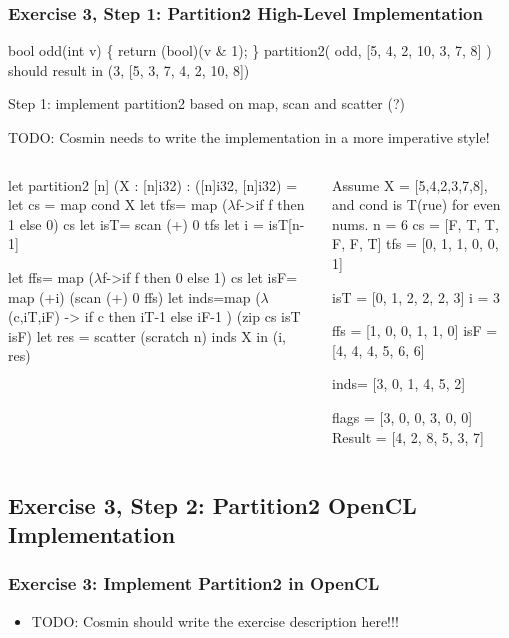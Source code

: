 \documentclass{beamer}
\newcommand{\mymath}[1]{$ #1 $}
\begin{document}
\begin{frame}[fragile,t]
  \frametitle{Exercise 3, Step 1: Partition2 High-Level Implementation}

\begin{colorcode}
bool odd(int v) \{ return (bool)(v & 1); \}
partition2( odd, [5, 4, 2, 10, 3, 7, 8] ) should result in
             (3, [5, 3, 7, 4, 2, 10, 8])
\end{colorcode}

Step 1: implement partition2 based on map, scan and scatter (?)\pause

TODO: Cosmin needs to write the implementation in a more imperative style!

\begin{columns}
\begin{colorcode}
let partition2 [n] (X : [n]i32) : 
              ([n]i32, [n]i32) =
 let cs = map cond X
 let tfs= map (\mymath{\lambda}f->if f then 1 
                        else 0) cs
 let isT= scan (+) 0 tfs
 let i  = isT[n-1]

 let ffs= map (\mymath{\lambda}f->if f then 0 
                        else 1) cs
 let isF= map (+i) (scan (+) 0 ffs)
 let inds=map (\mymath{\lambda}(c,iT,iF) -> 
                  if c then iT-1 
                       else iF-1
              ) (zip cs isT isF)
 let res = scatter (scratch n) inds X
 in (i, res)
\end{colorcode}
\vspace{-2ex}
\begin{colorcode}[fontsize=\scriptsize]
Assume X = [5,4,2,3,7,8], and 
cond is T(rue) for even nums.\pause
n   = 6
cs  = [F, T, T, F, F, T]
tfs = [0, 1, 1, 0, 0, 1]

isT = [0, 1, 2, 2, 2, 3]
i   = 3

ffs = [1, 0, 0, 1, 1, 0]
isF = [4, 4, 4, 5, 6, 6]

inds= [3, 0, 1, 4, 5, 2]


flags  = [3, 0, 0, 3, 0, 0]
Result = [4, 2, 8, 5, 3, 7] 
\end{colorcode}
\end{columns}


\end{frame}


\subsection{Exercise 3, Step 2: Partition2 OpenCL Implementation}

\begin{frame}[fragile,t]
  \frametitle{Exercise 3: Implement Partition2 in OpenCL}

\begin{itemize}
    \item TODO: Cosmin should write the exercise description here!!!
\end{itemize}

\end{frame}
\end{document}
